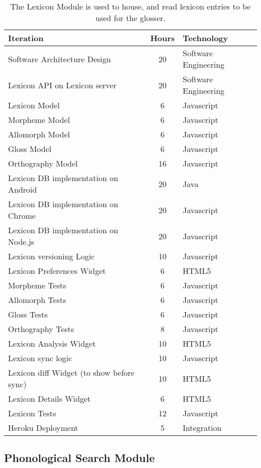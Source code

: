 \documentclass[12 pt]{article}
\begin{document}
\footnotesize
\begin{table}[htbp]
\begin{center}
  \begin{tabular}{ | lcl | }
\hline

Iteration&	Hours&	Technology	\\
\hline
Software Architecture Design&	20&	Software Engineering	\\ 
Lexicon API on Lexicon server&	20&	Software Engineering\\ 
Lexicon Model&	6&	Javascript	\\ 
Morpheme Model&	6&	Javascript	\\ 
Allomorph Model&	6&	Javascript	\\ 
Gloss Model&	6&	Javascript	\\ 
Orthography Model&	16&	Javascript	\\ 
Lexicon DB  implementation on Android&	20&	Java	\\ 
Lexicon DB  implementation on Chrome&	20&	Javascript	\\ 
Lexicon DB  implementation on Node.js&	20&	Javascript \\ 
Lexicon versioning Logic&	10&	Javascript	\\ 
Lexicon Preferences Widget&	6&	HTML5	\\ 
Morpheme Tests&	6&	Javascript	\\ 
Allomorph Tests&	6&	Javascript \\ 
Gloss Tests&	6&	Javascript	\\ 
Orthography Tests&	8&  Javascript \\ 
Lexicon Analysis Widget&	10&  HTML5 \\ 
Lexicon sync logic&	10&  Javascript \\ 
Lexicon diff Widget (to show before sync)&	10&  HTML5 \\ 
Lexicon Details Widget&	6&  HTML5 \\
Lexicon Tests&	12&  Javascript \\  
Heroku Deployment&	5&  Integration \\ 
\hline
  \end{tabular}
 \caption{The Lexicon Module is used to house, and read lexicon entries to be used for the glosser.}
  \label{tab:label}
  \end{center}
\end{table}

\newpage
\subsection{Phonological Search Module}
\end{document}
